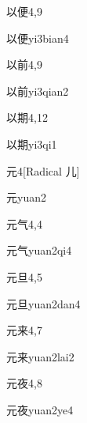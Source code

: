 \begin{entry}{以便}{4,9}
  \begin{phonetics}{以便}{yi3bian4}
  \end{phonetics}
\end{entry}

\begin{entry}{以前}{4,9}
  \begin{phonetics}{以前}{yi3qian2}
  \end{phonetics}
\end{entry}

\begin{entry}{以期}{4,12}
  \begin{phonetics}{以期}{yi3qi1}
  \end{phonetics}
\end{entry}

\begin{entry}{元}{4}[Radical 儿]
  \begin{phonetics}{元}{yuan2}
  \end{phonetics}
\end{entry}

\begin{entry}{元气}{4,4}
  \begin{phonetics}{元气}{yuan2qi4}
  \end{phonetics}
\end{entry}

\begin{entry}{元旦}{4,5}
  \begin{phonetics}{元旦}{yuan2dan4}
  \end{phonetics}
\end{entry}

\begin{entry}{元来}{4,7}
  \begin{phonetics}{元来}{yuan2lai2}
  \end{phonetics}
\end{entry}

\begin{entry}{元夜}{4,8}
  \begin{phonetics}{元夜}{yuan2ye4}
  \end{phonetics}
\end{entry}

